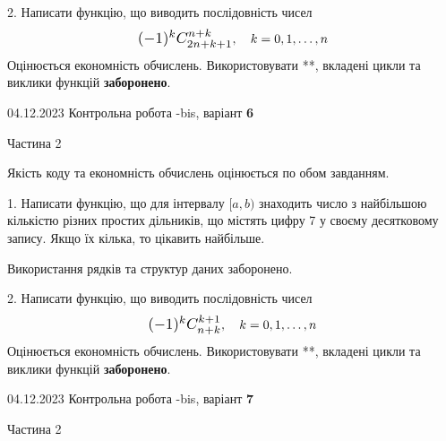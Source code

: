 \documentclass[12pt, ukrainian]{article}
\begin{document}
{{{{{\begin {Large}


2. 
Написати функцію, що виводить послідовність чисел
$$\scalebox{1.2}{$(-1)^{k}C_{2n+k+1}^{n+k}$}, \quad k=0,1,\ldots,n$$
Оцінюється економність обчислень. Використовувати **, вкладені цикли та виклики функцій \textbf{заборонено}.

\end{Large}\newpage




\begin {Huge}
{{04.12.2023 Контрольна робота -bis, варіант  \No \textbf { 6 }\par}}

\begin{center}Частина 2
\end{center}
\vspace{10mm}
\end {Huge}

{
\begin {Large}
Якість коду та економність обчислень оцінюється по обом завданням. 

\vspace{5mm}

1. Написати функцію, що для інтервалу $[a, b)$ знаходить число з найбільшою кількістю різних простих дільників, що містять цифру 7 у своєму десятковому запису. Якщо їх кілька, то цікавить найбільше.

 Використання рядків та структур даних заборонено. 



\vspace{10mm}



2. 
Написати функцію, що виводить послідовність чисел
$$\scalebox{1.2}{$(-1)^{k}C_{n+k}^{k+1}$}, \quad k=0,1,\ldots,n$$
Оцінюється економність обчислень. Використовувати **, вкладені цикли та виклики функцій \textbf{заборонено}.

\end{Large}\newpage




\begin {Huge}
{{04.12.2023 Контрольна робота -bis, варіант  \No \textbf { 7 }\par}}

\begin{center}Частина 2
\end{center}
\vspace{10mm}
\end {Huge}

}}}}}}
\end{document}
